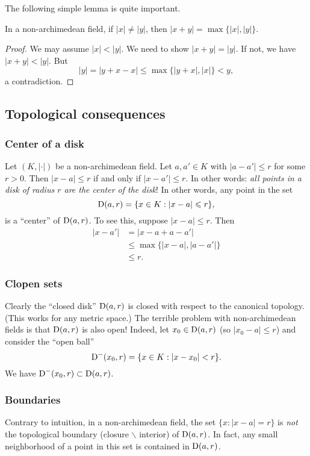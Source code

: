 The following simple lemma is quite important. 

\begin{lemma}\label{lem:abs-value-of-difference}
In a non-archimedean field, if $|x|\ne |y|$, then 
$|x+y|=\max\{|x|,|y|\}$. 
\end{lemma}
\begin{proof}
We may assume $|x|<|y|$. We need to show $|x+y|=|y|$. If not, we have 
$|x+y|<|y|$. But 
\[
  |y|=|y+x-x| \leqslant \max\{|y+x|,|x|\} < y ,
\]
a contradiction. 
\end{proof}





\subsection{Topological consequences}

\subsubsection{Center of a disk}

Let $(K,|\cdot|)$ be a non-archimedean field. Let $a,a'\in K$ with 
$|a-a'|\leqslant r$ for some $r>0$. Then $|x-a|\leqslant r$ if and only if 
$|x-a'|\leqslant r$. In other words: \emph{all points in a disk of radius $r$ 
are the center of the disk}! In other words, any point in the set  
\[
	\operatorname{D}(a,r) = \{x\in K:|x-a|\leqslant r\} ,
\]
is a ``center'' of $\operatorname{D}(a,r)$. To see this, suppose $|x-a|\leqslant r$. Then 
\begin{align*}
  |x-a'| 
    &= |x-a+a-a'| \\
    &\leqslant \max\{|x-a|,|a-a'|\} \\
    &\leqslant r .
\end{align*}

\subsubsection{Clopen sets}
Clearly the ``closed disk'' $\operatorname{D}(a,r)$ is closed with respect to the canonical 
topology. (This works for any metric space.) The terrible problem with 
non-archimedean fields is that $\operatorname{D}(a,r)$ is also open! Indeed, let 
$x_0\in \operatorname{D}(a,r)$ (so $|x_0-a|\leqslant r$) and consider the ``open ball'' 
\[
  \operatorname{D}^-(x_0,r) = \{x\in K:|x-x_0|<r\} .
\]
We have $\operatorname{D}^-(x_0,r)\subset \operatorname{D}(a,r)$. 

\subsubsection{Boundaries}
Contrary to intuition, in a non-archimedean field, the set 
$\{x\colon |x-a|=r\}$ is \emph{not} the topological boundary (closure 
$\smallsetminus$ interior) of $\operatorname{D}(a,r)$. In fact, any small neighborhood of 
a point in this set is contained in $\operatorname{D}(a,r)$. 


